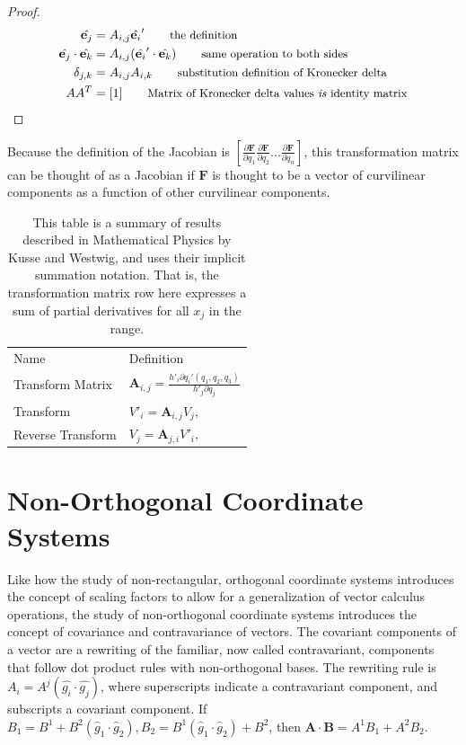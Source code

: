 \documentclass{article}
\begin{document}
\begin{proof}
\begin{align*}
\unit{j} &= A_{i,j} \unit{i}'                                  \tag*{\small {the definition}} \\
\unit{j} \cdot \unit{k} &= A_{i,j} (\unit{i}' \cdot \unit{k})  \tag*{\small {same operation to both sides}} \\
\delta_{j,k} &= A_{i,j} A_{i,k}                                \tag*{\small {substitution definition of Kronecker delta}} \\
A A^T &= [1]                                                   \tag*{\small {Matrix of Kronecker delta values \textit{is} identity matrix}} \\
\end{align*}
\label{proof:invert}
\end{proof}

Because the definition of the Jacobian is $ [\frac{\partial{\textbf{F}}}{\partial{q_1}}  \frac{\partial{\textbf{F}}}{\partial{q_2}} ... \frac{\partial{\textbf{F}}}{\partial{q_n}} ]$, this transformation matrix can be thought of as a Jacobian if $\textbf{F}$ is thought to be a vector of curvilinear components as a function of other curvilinear components.

\begin{table}
\begin{tabulary}{\textwidth}{|L|L|}
Name & Definition \\
Transform Matrix & $\textbf{A}_{i,j} = \frac{h'_i \partial{q_i'(q_1,q_2,q_3)}}{h'_j \partial{q_j}} $\\
\hline
Transform & $V'_i = \textbf{A}_{i,j} V_j, $\\
\hline
Reverse Transform & $V_j = \textbf{A}_{j,i} V'_i, $\\
\hline
\end{tabulary}
\caption{This table is a summary of results described in Mathematical Physics by Kusse and Westwig, and uses their implicit summation notation. That is, the transformation matrix row here expresses a sum of partial derivatives for all $x_j$ in the range.}

\label{tab:transform}
\end{table}

\section*{Non-Orthogonal Coordinate Systems}

Like how the study of non-rectangular, orthogonal coordinate systems introduces the concept of scaling factors to allow for a generalization of vector calculus operations, the study of non-orthogonal coordinate systems introduces the concept of covariance and contravariance of vectors. The covariant components of a vector are a rewriting of the familiar, now called contravariant, components that follow dot product rules with non-orthogonal bases. The rewriting rule is $A_i = A^j (\hat{g_i} \cdot \hat{g_j})$, where superscripts indicate a contravariant component, and subscripts a covariant component. If $B_1 = B^1 + B^2 (\hat{g}_1 \cdot \hat{g}_2), B_2 = B^1(\hat{g}_1 \cdot \hat{g}_2) + B^2$, then $\textbf{A} \cdot \textbf{B} = A^1 B_1 + A^2 B_2$. 
\end{document}
